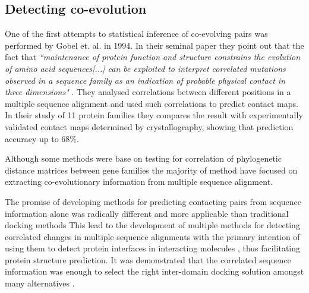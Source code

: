 
\subsection{Detecting co-evolution}

One of the first attempts to statistical inference of co-evolving pairs was performed by Gobel et. al. in 1994.
In their seminal paper they point out that the fact that \textit{``maintenance of protein function and structure constrains the evolution of amino acid sequences[...] can be exploited to interpret correlated mutations observed in a sequence family as an indication of probable physical contact in three dimensions"} \cite{gobel1994correlated}. 
They  analysed correlations between different positions in a multiple sequence alignment and used such correlations to predict contact maps.
In their study of 11 protein families they compares the result with experimentally validated contact maps determined by crystallography, showing that prediction accuracy up to $68\%$.

Although some methods were base on testing for correlation of phylogenetic distance matrices between gene families \cite{rohlfs2010detecting} the majority of method have focused on extracting co-evolutionary information from multiple sequence alignment.

The promise of developing methods for predicting contacting pairs from sequence information alone was radically different and more applicable than traditional docking methods \cite{pazos1997correlated}
This lead to the development of multiple methods for detecting correlated changes in multiple sequence alignments with the primary intention of using them to detect protein interfaces in interacting molecules \cite{pazos1997correlated}, thus facilitating protein structure prediction.
It was demonstrated that the correlated sequence information was enough to select the right inter-domain docking solution amongst many alternatives  \cite{pazos1997correlated}.

